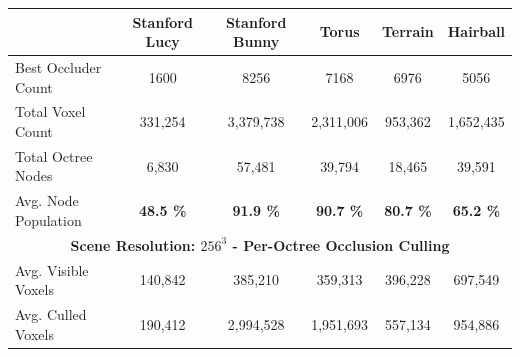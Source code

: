 \begin{table}[!htb]
  \begin{tabular}{|lccccc|}
    \hline
    \multicolumn{1}{|l|}{}                          & \multicolumn{1}{|c|}{\textbf{Stanford Lucy}}  & \multicolumn{1}{c|}{\textbf{Stanford Bunny}}  & \multicolumn{1}{c|}{\textbf{Torus}}   & \multicolumn{1}{c|}{\textbf{Terrain}}     & \multicolumn{1}{c|}{\textbf{Hairball}}    \\ \hline
    \multicolumn{1}{|l|}{Best Occluder Count}       & \multicolumn{1}{c|}{1600}                     & \multicolumn{1}{c|}{8256}                     & \multicolumn{1}{c|}{7168}             & \multicolumn{1}{c|}{6976}                 & \multicolumn{1}{c|}{5056}                 \\ 
    \multicolumn{1}{|l|}{Total Voxel Count}         & \multicolumn{1}{c|}{331,254}                  & \multicolumn{1}{c|}{3,379,738}                & \multicolumn{1}{c|}{2,311,006}        & \multicolumn{1}{c|}{953,362}              & \multicolumn{1}{c|}{1,652,435}            \\
    \multicolumn{1}{|l|}{Total Octree Nodes}        & \multicolumn{1}{c|}{6,830}                    & \multicolumn{1}{c|}{57,481}                   & \multicolumn{1}{c|}{39,794}           & \multicolumn{1}{c|}{18,465}               & \multicolumn{1}{c|}{39,591}               \\
    \multicolumn{1}{|l|}{Avg. Node Population}      & \multicolumn{1}{c|}{\textbf{48.5 \%}}         & \multicolumn{1}{c|}{\textbf{91.9 \%}}         & \multicolumn{1}{c|}{\textbf{90.7 \%}} & \multicolumn{1}{c|}{\textbf{80.7 \%}}     & \multicolumn{1}{c|}{\textbf{65.2 \%}}     \\ \hline
    \multicolumn{6}{|c|}{\textbf{Scene Resolution: $256^3$ - Per-Octree Occlusion Culling}}                                                                                                                                                                                         \\ \hline
    \multicolumn{1}{|l|}{Avg. Visible Voxels}       & \multicolumn{1}{c|}{140,842}                  & \multicolumn{1}{c|}{385,210}                  & \multicolumn{1}{c|}{359,313}          & \multicolumn{1}{c|}{396,228}              & \multicolumn{1}{c|}{697,549}              \\
    \multicolumn{1}{|l|}{Avg. Culled Voxels}        & \multicolumn{1}{c|}{190,412}                  & \multicolumn{1}{c|}{2,994,528}                & \multicolumn{1}{c|}{1,951,693}        & \multicolumn{1}{c|}{557,134}              & \multicolumn{1}{c|}{954,886}              \\

\end{tabular}
\end{table}
